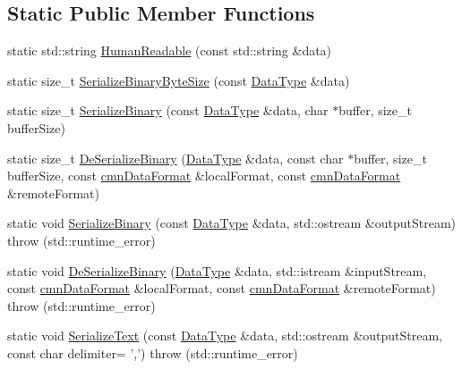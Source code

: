 \subsection*{Static Public Member Functions}
\begin{DoxyCompactItemize}
\item 
static std\-::string \hyperlink{classcmn_data_3_01std_1_1string_01_4_ab72e4cd237cd5e96082f78de567e7f3d}{Human\-Readable} (const std\-::string \&data)
\item 
static size\-\_\-t \hyperlink{classcmn_data_3_01std_1_1string_01_4_a79f235f21898f0dd6a1a06b004376cd3}{Serialize\-Binary\-Byte\-Size} (const \hyperlink{classcmn_data_3_01std_1_1string_01_4_a04ffa92a93dc010ed2bf5bf19e2d0fdd}{Data\-Type} \&data)
\item 
static size\-\_\-t \hyperlink{classcmn_data_3_01std_1_1string_01_4_a4d9477de95262309f00ddacba4eb0c7e}{Serialize\-Binary} (const \hyperlink{classcmn_data_3_01std_1_1string_01_4_a04ffa92a93dc010ed2bf5bf19e2d0fdd}{Data\-Type} \&data, char $\ast$buffer, size\-\_\-t buffer\-Size)
\item 
static size\-\_\-t \hyperlink{classcmn_data_3_01std_1_1string_01_4_acbeb843828f9b208ed26168c062c5667}{De\-Serialize\-Binary} (\hyperlink{classcmn_data_3_01std_1_1string_01_4_a04ffa92a93dc010ed2bf5bf19e2d0fdd}{Data\-Type} \&data, const char $\ast$buffer, size\-\_\-t buffer\-Size, const \hyperlink{classcmn_data_format}{cmn\-Data\-Format} \&local\-Format, const \hyperlink{classcmn_data_format}{cmn\-Data\-Format} \&remote\-Format)
\item 
static void \hyperlink{classcmn_data_3_01std_1_1string_01_4_a3da6817f8e087699209c649e5061c909}{Serialize\-Binary} (const \hyperlink{classcmn_data_3_01std_1_1string_01_4_a04ffa92a93dc010ed2bf5bf19e2d0fdd}{Data\-Type} \&data, std\-::ostream \&output\-Stream)  throw (std\-::runtime\-\_\-error)
\item 
static void \hyperlink{classcmn_data_3_01std_1_1string_01_4_a1fbbb3421661a7cc5220e484dfeba7fb}{De\-Serialize\-Binary} (\hyperlink{classcmn_data_3_01std_1_1string_01_4_a04ffa92a93dc010ed2bf5bf19e2d0fdd}{Data\-Type} \&data, std\-::istream \&input\-Stream, const \hyperlink{classcmn_data_format}{cmn\-Data\-Format} \&local\-Format, const \hyperlink{classcmn_data_format}{cmn\-Data\-Format} \&remote\-Format)  throw (std\-::runtime\-\_\-error)
\item 
static void \hyperlink{classcmn_data_3_01std_1_1string_01_4_a064c3fce632bc2558828502e2a1ccbcf}{Serialize\-Text} (const \hyperlink{classcmn_data_3_01std_1_1string_01_4_a04ffa92a93dc010ed2bf5bf19e2d0fdd}{Data\-Type} \&data, std\-::ostream \&output\-Stream, const char delimiter= ',')  throw (std\-::runtime\-\_\-error)

\end{DoxyCompactItemize}
